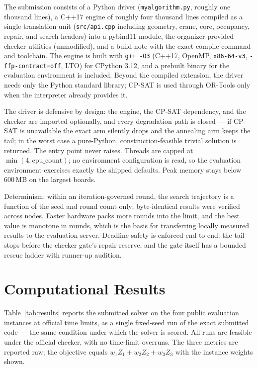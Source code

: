 \documentclass[runningheads]{llncs}
\begin{document}
The submission consists of a Python driver (\texttt{myalgorithm.py}, roughly
one thousand lines), a C++17 engine of roughly four thousand lines compiled
as a single translation unit (\texttt{src/api.cpp} including geometry, crane,
core, occupancy, repair, and search headers) into a pybind11 module, the
organizer-provided checker utilities (unmodified), and a build note with the
exact compile command and toolchain. The engine is built with
\texttt{g++ -O3} (C++17, OpenMP, \texttt{x86-64-v3},
\texttt{-ffp-contract=off}, LTO) for CPython 3.12, and a prebuilt binary for
the evaluation environment is included. Beyond the compiled extension, the
driver needs only the Python standard library; CP-SAT is used through
OR-Tools only when the interpreter already provides it.

The driver is defensive by design: the engine, the CP-SAT dependency, and the
checker are imported optionally, and every degradation path is closed --- if
CP-SAT is unavailable the exact arm silently drops and the annealing arm
keeps the tail; in the worst case a pure-Python, construction-feasible
trivial solution is returned. The entry point never raises. Threads are
capped at $\min(4, \mathrm{cpu\_count})$; no environment configuration is
read, so the evaluation environment exercises exactly the shipped defaults.
Peak memory stays below 600\,MB on the largest boards.

Determinism: within an iteration-governed round, the search trajectory is a
function of the seed and round count only; byte-identical results were
verified across nodes. Faster hardware packs more rounds into the limit, and
the best value is monotone in rounds, which is the basis for transferring
locally measured results to the evaluation server. Deadline safety is
enforced end to end: the tail stops before the checker gate's repair reserve,
and the gate itself has a bounded rescue ladder with runner-up audition.

\section{Computational Results}

Table~\ref{tab:results} reports the submitted solver on the four public
evaluation instances at official time limits, as a single fixed-seed run of
the exact submitted code --- the same condition under which the solver is
scored. All runs are feasible under the official checker, with no time-limit
overruns. The three metrics are reported raw; the objective equals
$w_1 Z_1 + w_2 Z_2 + w_3 Z_3$ with the instance weights shown.
\end{document}
